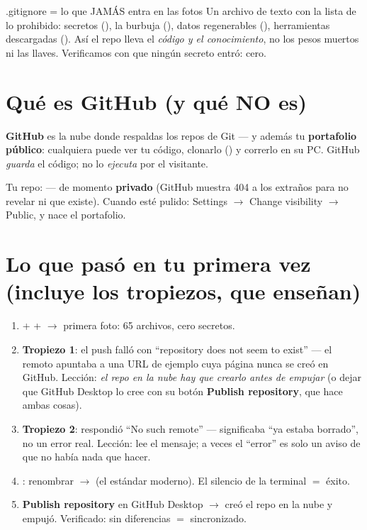 \documentclass[11pt,a4paper]{article}
\begin{document}
\begin{concepto}{.gitignore = lo que JAMÁS entra en las fotos}
Un archivo de texto con la lista de lo prohibido: secretos (), la
burbuja (), datos regenerables (), herramientas descargadas
(). Así el repo lleva el \emph{código y el conocimiento}, no los pesos muertos
ni las llaves. Verificamos con  que ningún secreto entró: cero.
\end{concepto}

\section{Qué es GitHub (y qué NO es)}

\textbf{GitHub} es la nube donde respaldas los repos de Git — y además tu \textbf{portafolio
público}: cualquiera puede ver tu código, clonarlo () y correrlo en su PC.
GitHub \emph{guarda} el código; no lo \emph{ejecuta} por el visitante.

Tu repo:  — de momento \textbf{privado} (GitHub
muestra 404 a los extraños para no revelar ni que existe). Cuando esté pulido:
Settings $\rightarrow$ Change visibility $\rightarrow$ Public, y nace el portafolio.

\section{Lo que pasó en tu primera vez (incluye los tropiezos, que enseñan)}

\begin{enumerate}
  \item {} +  +  $\rightarrow$ primera
        foto: 65 archivos, cero secretos.
  \item \textbf{Tropiezo 1}: el push falló con ``repository does not seem to exist'' — el
        remoto apuntaba a una URL de ejemplo cuya página nunca se creó en GitHub. Lección:
        \emph{el repo en la nube hay que crearlo antes de empujar} (o dejar que GitHub
        Desktop lo cree con su botón \textbf{Publish repository}, que hace ambas cosas).
  \item \textbf{Tropiezo 2}:  respondió ``No such remote''
        — significaba ``ya estaba borrado'', no un error real. Lección: lee el mensaje;
        a veces el ``error'' es solo un aviso de que no había nada que hacer.
  \item {}: renombrar  $\rightarrow$ 
        (el estándar moderno). El silencio de la terminal $=$ éxito.
  \item \textbf{Publish repository} en GitHub Desktop $\rightarrow$ creó el repo en la nube y
        empujó. Verificado:  sin diferencias $=$ sincronizado.
\end{enumerate}
\end{document}
